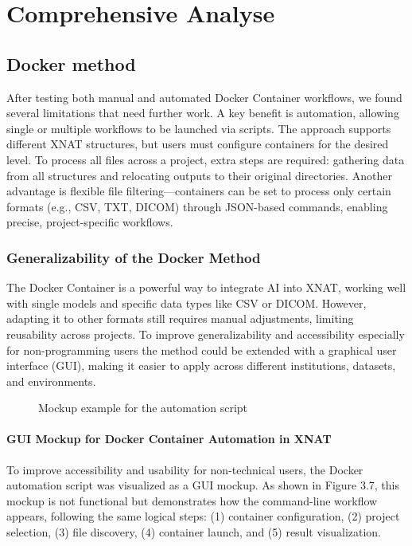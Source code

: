 \chapter{Comprehensive Analyse}
\section{Docker method}

After testing both manual and automated Docker Container workflows, we found several limitations that need further work. A key benefit is automation, allowing single or multiple workflows to be launched via scripts. The approach supports different XNAT structures, but users must configure containers for the desired level. To process all files across a project, extra steps are required: gathering data from all structures and relocating outputs to their original directories. Another advantage is flexible file filtering—containers can be set to process only certain formats (e.g., CSV, TXT, DICOM) through JSON-based commands, enabling precise, project-specific workflows.

\subsection{Generalizability of the Docker Method}
The Docker Container is a powerful way to integrate AI into XNAT, working well with single models and specific data types like CSV or DICOM. However, adapting it to other formats still requires manual adjustments, limiting reusability across projects. To improve generalizability and accessibility especially for non-programming users the method could be extended with a graphical user interface (GUI), making it easier to apply across different institutions, datasets, and environments. 
\begin{figure}[H]
    \centering
    \def\svgwidth{\linewidth} 
    
    \caption{Mockup example for the automation script}
    \label{fig:workflowxnat}
\end{figure}
\normalsize
\subsubsection{GUI Mockup for Docker Container Automation in XNAT}

To improve accessibility and usability for non-technical users, the Docker automation script was visualized as a GUI mockup. As shown in Figure 3.7, this mockup is not functional but demonstrates how the command-line workflow appears, following the same logical steps: (1) container configuration, (2) project selection, (3) file discovery, (4) container launch, and (5) result visualization.
